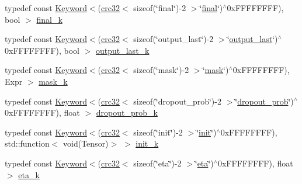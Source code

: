 \begin{DoxyCompactItemize}
\item 
typedef const \hyperlink{classmarian_1_1keywords_1_1Keyword}{Keyword}$<$(\hyperlink{compile__time__crc32_8h_afb8250edaa6a10de4050142c2361fbce}{crc32}$<$ sizeof(\char`\"{}final\char`\"{})-\/2 $>$\char`\"{}\hyperlink{namespacemarian_1_1keywords_a9b8967da2700e334a8af43c39e209cd1}{final}\char`\"{})$^\wedge$0x\+F\+F\+F\+F\+F\+F\+F\+F), bool $>$ \hyperlink{namespacemarian_1_1keywords_a6416d66a33fc4d5ed5137bb91d826468}{final\+\_\+k}
\item 
typedef const \hyperlink{classmarian_1_1keywords_1_1Keyword}{Keyword}$<$(\hyperlink{compile__time__crc32_8h_afb8250edaa6a10de4050142c2361fbce}{crc32}$<$ sizeof(\char`\"{}output\+\_\+last\char`\"{})-\/2 $>$\char`\"{}\hyperlink{namespacemarian_1_1keywords_ac5ea87324c60b3d734549deaa16cce9d}{output\+\_\+last}\char`\"{})$^\wedge$0x\+F\+F\+F\+F\+F\+F\+F\+F), bool $>$ \hyperlink{namespacemarian_1_1keywords_afaaf278d8f77b3c17f0cf76af88bea1e}{output\+\_\+last\+\_\+k}
\item 
typedef const \hyperlink{classmarian_1_1keywords_1_1Keyword}{Keyword}$<$(\hyperlink{compile__time__crc32_8h_afb8250edaa6a10de4050142c2361fbce}{crc32}$<$ sizeof(\char`\"{}mask\char`\"{})-\/2 $>$\char`\"{}\hyperlink{namespacemarian_1_1keywords_a201bea6bea8108889b63081132cc3cd7}{mask}\char`\"{})$^\wedge$0x\+F\+F\+F\+F\+F\+F\+F\+F), Expr $>$ \hyperlink{namespacemarian_1_1keywords_a4fed5db0f88a6137048eda92fb776eb3}{mask\+\_\+k}
\item 
typedef const \hyperlink{classmarian_1_1keywords_1_1Keyword}{Keyword}$<$(\hyperlink{compile__time__crc32_8h_afb8250edaa6a10de4050142c2361fbce}{crc32}$<$ sizeof(\char`\"{}dropout\+\_\+prob\char`\"{})-\/2 $>$\char`\"{}\hyperlink{namespacemarian_1_1keywords_aeb1a41f81a79487b23aa2f8769a205bf}{dropout\+\_\+prob}\char`\"{})$^\wedge$0x\+F\+F\+F\+F\+F\+F\+F\+F), float $>$ \hyperlink{namespacemarian_1_1keywords_ae28ddaf0d8f158549fa260ef510ec27d}{dropout\+\_\+prob\+\_\+k}
\item 
typedef const \hyperlink{classmarian_1_1keywords_1_1Keyword}{Keyword}$<$(\hyperlink{compile__time__crc32_8h_afb8250edaa6a10de4050142c2361fbce}{crc32}$<$ sizeof(\char`\"{}init\char`\"{})-\/2 $>$\char`\"{}\hyperlink{namespacemarian_1_1keywords_afdd3807e3d6fe2bc979d11fa0cf3ee3e}{init}\char`\"{})$^\wedge$0x\+F\+F\+F\+F\+F\+F\+F\+F), std\+::function$<$ void(\+Tensor)$>$ $>$ \hyperlink{namespacemarian_1_1keywords_a4fd3849e3b95e8aac7ab3ee9df8f517d}{init\+\_\+k}
\item 
typedef const \hyperlink{classmarian_1_1keywords_1_1Keyword}{Keyword}$<$(\hyperlink{compile__time__crc32_8h_afb8250edaa6a10de4050142c2361fbce}{crc32}$<$ sizeof(\char`\"{}eta\char`\"{})-\/2 $>$\char`\"{}\hyperlink{namespacemarian_1_1keywords_af8a81aa00fe33fd2eea3287b1bff35be}{eta}\char`\"{})$^\wedge$0x\+F\+F\+F\+F\+F\+F\+F\+F), float $>$ \hyperlink{namespacemarian_1_1keywords_a434be77c98bf73e98aecaf646e223289}{eta\+\_\+k}

\end{DoxyCompactItemize}
